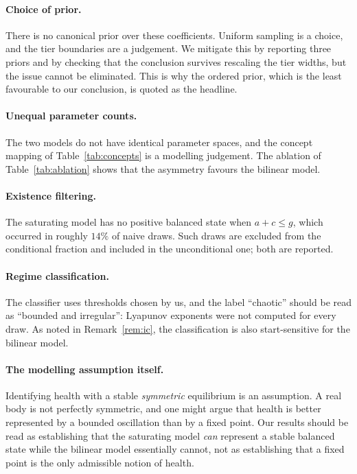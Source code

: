 \documentclass[11pt]{article}
\begin{document}
\paragraph{Choice of prior.}
There is no canonical prior over these coefficients. Uniform sampling is a
choice, and the tier boundaries are a judgement. We mitigate this by reporting
three priors and by checking that the conclusion survives rescaling the tier
widths, but the issue cannot be eliminated. This is why the ordered prior, which
is the least favourable to our conclusion, is quoted as the headline.

\paragraph{Unequal parameter counts.}
The two models do not have identical parameter spaces, and the concept mapping of
Table~\ref{tab:concepts} is a modelling judgement. The ablation of
Table~\ref{tab:ablation} shows that the asymmetry favours the bilinear model.

\paragraph{Existence filtering.}
The saturating model has no positive balanced state when $a+c\le g$, which
occurred in roughly $14\%$ of naive draws. Such draws are excluded from the
conditional fraction and included in the unconditional one; both are reported.

\paragraph{Regime classification.}
The classifier uses thresholds chosen by us, and the label ``chaotic'' should be
read as ``bounded and irregular'': Lyapunov exponents were not computed for every
draw. As noted in Remark~\ref{rem:ic}, the classification is also
start-sensitive for the bilinear model.

\paragraph{The modelling assumption itself.}
Identifying health with a stable \emph{symmetric} equilibrium is an assumption.
A real body is not perfectly symmetric, and one might argue that health is better
represented by a bounded oscillation than by a fixed point. Our results should be
read as establishing that the saturating model \emph{can} represent a stable
balanced state while the bilinear model essentially cannot, not as establishing
that a fixed point is the only admissible notion of health.
\end{document}
